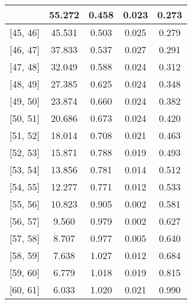 \documentclass[12pt]{article}
\begin{document}
\begin{table}[]
\begin{tabular}{c|c|c|c|c|}
{\multicolumn{1}{|c|}{{[}44,  45{]}}  & 55.272 & 0.458 & 0.023 & 0.273 \\ \hline 
\multicolumn{1}{|c|}{{[}45,  46{]}}  & 45.531 & 0.503 & 0.025 & 0.279 \\ \hline 
\multicolumn{1}{|c|}{{[}46,  47{]}}  & 37.833 & 0.537 & 0.027 & 0.291 \\ \hline 
\multicolumn{1}{|c|}{{[}47,  48{]}}  & 32.049 & 0.588 & 0.024 & 0.312 \\ \hline 
\multicolumn{1}{|c|}{{[}48,  49{]}}  & 27.385 & 0.625 & 0.024 & 0.348 \\ \hline 
\multicolumn{1}{|c|}{{[}49,  50{]}}  & 23.874 & 0.660 & 0.024 & 0.382 \\ \hline 
\multicolumn{1}{|c|}{{[}50,  51{]}}  & 20.686 & 0.673 & 0.024 & 0.420 \\ \hline 
\multicolumn{1}{|c|}{{[}51,  52{]}}  & 18.014 & 0.708 & 0.021 & 0.463 \\ \hline 
\multicolumn{1}{|c|}{{[}52,  53{]}}  & 15.871 & 0.788 & 0.019 & 0.493 \\ \hline 
\multicolumn{1}{|c|}{{[}53,  54{]}}  & 13.856 & 0.781 & 0.014 & 0.512 \\ \hline 
\multicolumn{1}{|c|}{{[}54,  55{]}}  & 12.277 & 0.771 & 0.012 & 0.533 \\ \hline 
\multicolumn{1}{|c|}{{[}55,  56{]}}  & 10.823 & 0.905 & 0.002 & 0.581 \\ \hline 
\multicolumn{1}{|c|}{{[}56,  57{]}}  & 9.560 & 0.979 & 0.002 & 0.627 \\ \hline 
\multicolumn{1}{|c|}{{[}57,  58{]}}  & 8.707 & 0.977 & 0.005 & 0.640 \\ \hline 
\multicolumn{1}{|c|}{{[}58,  59{]}}  & 7.638 & 1.027 & 0.012 & 0.684 \\ \hline 
\multicolumn{1}{|c|}{{[}59,  60{]}}  & 6.779 & 1.018 & 0.019 & 0.815 \\ \hline 
\multicolumn{1}{|c|}{{[}60,  61{]}}  & 6.033 & 1.020 & 0.021 & 0.990 \\ \hline 
\end{tabular}
\end{table}
\end{document}
